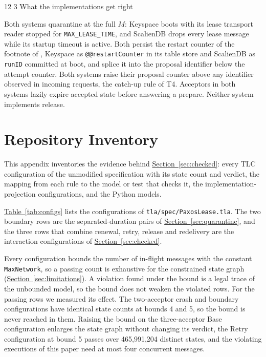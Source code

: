\documentclass[final,5p,times,twocolumn,number]{elsarticle}
\makeatletter
\newcommand{\code}[1]{\texttt{#1}}
\newcommand{\secref}[1]{\hyperref[#1]{Section~\ref*{#1}}}
\newcommand{\tabref}[1]{\hyperref[#1]{Table~\ref*{#1}}}
\renewcommand\subsection{\@startsection{subsection}{2}{\z@}%
           {12\p@ \@plus 6\p@ \@minus 3\p@}%
           {3\p@ \@plus 6\p@ \@minus 3\p@}%
           {\normalfont\normalsize\bfseries}}
\makeatother
\begin{document}
\subsection{What the implementations get right}

Both systems quarantine at the full $M$: Keyspace boots with its lease transport reader stopped for \code{MAX\_LEASE\_TIME}, and ScalienDB drops every lease message while its startup timeout is active.  Both persist the restart counter of the footnote of \cite{ref1}, Keyspace as \code{@@restartCounter} in its table store and ScalienDB as \code{runID} committed at boot, and splice it into the proposal identifier below the attempt counter.  Both systems raise their proposal counter above any identifier observed in incoming requests, the catch-up rule of T4.  Acceptors in both systems lazily expire accepted state before answering a prepare.  Neither system implements release.

\section{Repository Inventory}\label{app:artifact}

This appendix inventories the evidence behind \secref{sec:checked}: every TLC configuration of the unmodified specification with its state count and verdict, the mapping from each rule to the model or test that checks it, the implementation-projection configurations, and the Python models.

\tabref{tab:configs} lists the configurations of \code{tla/spec/PaxosLease.tla}.  The two boundary rows are the separated-duration pairs of \secref{sec:quarantine}, and the three rows that combine renewal, retry, release and redelivery are the interaction configurations of \secref{sec:checked}.

Every configuration bounds the number of in-flight messages with the constant \code{MaxNetwork}, so a passing count is exhaustive for the constrained state graph (\secref{sec:limitations}).  A violation found under the bound is a legal trace of the unbounded model, so the bound does not weaken the violated rows.  For the passing rows we measured its effect.  The two-acceptor crash and boundary configurations have identical state counts at bounds 4 and 5, so the bound is never reached in them.  Raising the bound on the three-acceptor Base configuration enlarges the state graph without changing its verdict, the Retry configuration at bound 5 passes over 465{,}991{,}204 distinct states, and the violating executions of this paper need at most four concurrent messages.
\end{document}

